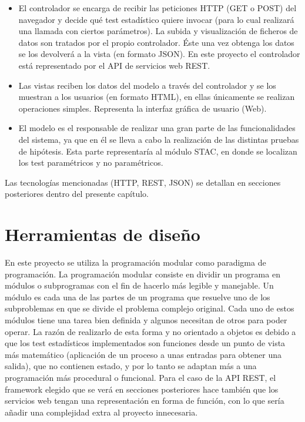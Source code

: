 \begin{itemize}
\item El controlador se encarga de recibir las peticiones HTTP (GET o POST) del navegador y decide qué test estadístico quiere invocar (para lo cual realizará una llamada con ciertos parámetros). La subida y visualización de ficheros de datos son tratados por el propio controlador. Éste una vez obtenga los datos se los devolverá a la vista (en formato JSON). En este proyecto el controlador está representado por el API de servicios web REST.
\item Las vistas reciben los datos del modelo a través del controlador y se los muestran a los usuarios (en formato HTML), en ellas únicamente se realizan operaciones simples. Representa la interfaz gráfica de usuario (Web).
\item El modelo es el responsable de realizar una gran parte de las funcionalidades del sistema, ya que en él se lleva a cabo la realización de las distintas pruebas de hipótesis. Esta parte representaría al módulo STAC, en donde se localizan los test paramétricos y no paramétricos.
\end{itemize}

Las tecnologías mencionadas (HTTP, REST, JSON) se detallan en secciones posteriores dentro del presente capítulo.

\section{Herramientas de diseño}
En este proyecto se utiliza la programación modular como paradigma de programación. La programación modular consiste en dividir un programa en módulos o subprogramas con el fin de hacerlo más legible y manejable. Un módulo es cada una de las partes de un programa que resuelve uno de los subproblemas en que se divide el problema complejo original. Cada uno de estos módulos tiene una tarea bien definida y algunos necesitan de otros para poder operar. La razón de realizarlo de esta forma y no orientado a objetos es debido a que los test estadísticos implementados son funciones desde un punto de vista más matemático (aplicación de un proceso a unas entradas para obtener una salida), que no contienen estado, y por lo tanto se adaptan más a una programación más procedural o funcional. Para el caso de la API REST, el framework elegido que se verá en secciones posteriores hace también que los servicios web tengan una representación en forma de función, con lo que sería añadir una complejidad extra al proyecto innecesaria.

